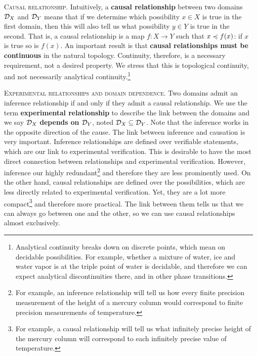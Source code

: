 \documentclass[10pt,twocolumn, nofootinbib]{revtex4-1}
\newcommand\partitle[1]{\textsc{#1}.}
\begin{document}
\partitle{Causal relationship} Intuitively, a \textbf{causal relationship} between two domains $\mathcal{D}_X$ and $\mathcal{D}_Y$ means that if we determine which possibility $x \in X$ is true in the first domain, then this will also tell us what possibility $y \in Y$ is true in the second. That is, a causal relationship is a map $f : X \to Y$ such that $x \preccurlyeq f(x)$: if $x$ is true so is $f(x)$. An important result is that \textbf{causal relationships must be continuous} in the natural topology. Continuity, therefore, is a necessary requirement, not a desired property. We stress that this is topological continuity, and not necessarily analytical continuity.\footnote{Analytical continuity breaks down on discrete points, which mean on decidable possibilities. For example, whether a mixture of water, ice and water vapor is at the triple point of water is decidable, and therefore we can expect analytical discontinuities there, and in other phase transitions.}

\partitle{Experimental relationships and domain dependence} Two domains admit an inference relationship if and only if they admit a causal relationship. We use the term \textbf{experimental relationship} to describe the link between the domains and we say $\mathcal{D}_X$ \textbf{depends on} $\mathcal{D}_Y$, noted $\mathcal{D}_X \subseteq \mathcal{D}_Y$. Note that the inference works in the opposite direction of the cause. The link between inference and causation is very important. Inference relationships are defined over verifiable statements, which are our link to experimental verification. This is desirable to have the most direct connection between relationships and experimental verification. However, inference our highly redundant\footnote{For example, an inference relationship will tell us how every finite precision measurement of the height of a mercury column would correspond to finite precision measurements of temperature.} and therefore they are less prominently used. On the other hand, causal relationships are defined over the possibilities, which are less directly related to experimental verification. Yet, they are a lot more compact\footnote{For example, a causal relationship will tell us what infinitely precise height of the mercury column will correspond to each infinitely precise value of temperature.} and therefore more practical. The link between them tells us that we can always go between one and the other, so we can use causal relationships almost exclusively.
\end{document}
